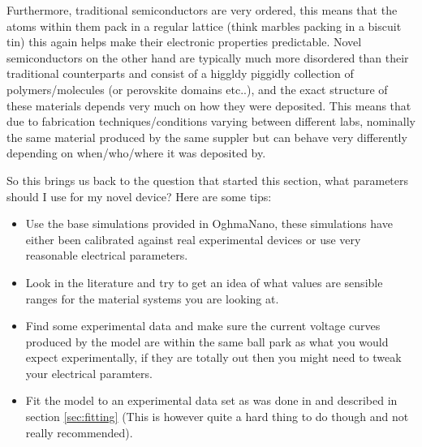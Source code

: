 Furthermore, traditional semiconductors are very ordered, this means that the atoms within them pack in a regular lattice (think marbles packing in a biscuit tin) this again helps make their electronic properties predictable. Novel semiconductors on the other hand are typically much more disordered than their traditional counterparts and consist of a higgldy piggidly collection of polymers/molecules (or perovskite domains etc..), and the exact structure of these materials depends very much on how they were deposited. This means that due to fabrication techniques/conditions varying between different labs, nominally the same material produced by the same suppler but can behave very differently depending on when/who/where it was deposited by.

So this brings us back to the question that started this section, what parameters should I use for my novel device? Here are some tips:

\begin{itemize}
  \item Use the base simulations provided in OghmaNano, these simulations have either been calibrated against real experimental devices or use very reasonable electrical parameters.
  \item Look in the literature and try to get an idea of what values are sensible ranges for the material systems you are looking at.
  \item Find some experimental data and make sure the current voltage curves produced by the model are within the same ball park as what you would expect experimentally, if they are totally out then you might need to tweak your electrical paramters.
  \item Fit the model to an experimental data set as was done in \cite{mackenzie2012extracting} and described in section \ref{sec:fitting} (This is however quite a hard thing to do though and not really recommended).
\end{itemize}


